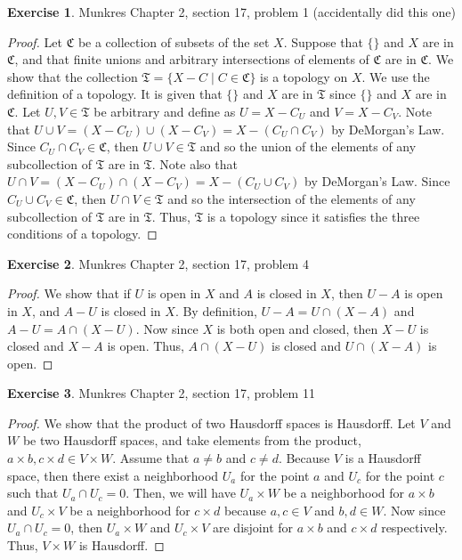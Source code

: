 \documentclass[12pt]{article}
\theoremstyle{definition}
\newtheorem{exercise}{Exercise}
\begin{document}
\begin{exercise} Munkres Chapter 2, section 17, problem 1 (accidentally did this one)
\begin{proof}
	Let $\mathfrak{C}$ be a collection of subsets of the set $X$. Suppose that $\{\}$ and $X$ are in $\mathfrak{C}$, and that finite unions and arbitrary intersections of elements of $\mathfrak{C}$ are in $\mathfrak{C}$. We show that the collection $\mathfrak{T}=\{X-C\mid C\in\mathfrak{C}\}$ is a topology on $X$. We use the definition of a topology. It is given that $\{\}$ and $X$ are in $\mathfrak{T}$ since $\{\}$ and $X$ are in $\mathfrak{C}$. Let $U,V\in\mathfrak{T}$ be arbitrary and define as $U=X-C_U$ and $V=X-C_V$. Note that $U\cup V=(X-C_U)\cup(X-C_V)=X-(C_U\cap C_V)$ by DeMorgan's Law. Since $C_U\cap C_V\in\mathfrak{C}$, then $U\cup V\in\mathfrak{T}$ and so the union of the elements of any subcollection of $\mathfrak{T}$ are in $\mathfrak{T}$. Note also that $U\cap V=(X-C_U)\cap(X-C_V)=X-(C_U\cup C_V)$ by DeMorgan's Law. Since $C_U\cup C_V\in\mathfrak{C}$, then $U\cap V\in\mathfrak{T}$ and so the intersection of the elements of any subcollection of $\mathfrak{T}$ are in $\mathfrak{T}$. Thus, $\mathfrak{T}$ is a topology since it satisfies the three conditions of a topology.
\end{proof}
\end{exercise}

\begin{exercise} Munkres Chapter 2, section 17, problem 4
\begin{proof}
	We show that if $U$ is open in $X$ and $A$ is closed in $X$, then $U-A$ is open in $X$, and $A-U$ is closed in $X$. By definition, $U-A=U\cap (X-A)$ and $A-U=A\cap (X-U)$. Now since $X$ is both open and closed, then $X-U$ is closed and $X-A$ is open. Thus, $A\cap (X-U)$ is closed and $U\cap (X-A)$ is open.
\end{proof}
\end{exercise}

\begin{exercise} Munkres Chapter 2, section 17, problem 11  
\begin{proof}
	We show that the product of two Hausdorff spaces is Hausdorff. Let $V$ and $W$ be two Hausdorff spaces, and take elements from the product, $a\times b, c\times d\in V\times W$. Assume that $a\neq b$ and $c\neq d$. Because $V$ is a Hausdorff space, then there exist a neighborhood $U_a$ for the point $a$ and $U_c$ for the point $c$ such that $U_a\cap U_c=0$. Then, we will have $U_a\times W$ be a neighborhood for $a\times b$ and $U_c\times V$ be a neighborhood for $c\times d$ because $a,c\in V$ and $b,d\in W$. Now since $U_a\cap U_c=0$, then $U_a\times W$ and $U_c\times V$ are disjoint for $a\times b$ and $c\times d$ respectively. Thus, $V\times W$ is Hausdorff.  
\end{proof}
\end{exercise}
\end{document}
